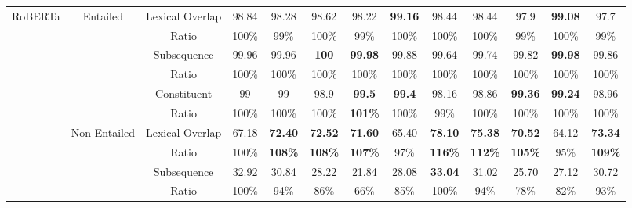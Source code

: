\begin{table}[]
\begin{tabular}{|c|c|c|c|c|c|c|c|c|c|c|c|c|}
\multirow{14}{*}{RoBERTa} & \multirow{6}{*}{Entailed}     & Lexical Overlap & 98.84                     & 98.28                          & 98.62   & 98.22   & \bf 99.16   & 98.44   & 98.44   & 97.9   & \bf 99.08  & 97.7   \\ \cline{3-13} 
                          &                               & Ratio           & 100\%                     & 99\%                           & 100\%   & 99\%    & 100\%   & 100\%   & 100\%   & 99\%   & 100\%  & 99\%   \\ \cline{3-13} 
                          &                               & Subsequence     & 99.96                     & 99.96                          & \bf 100     & \bf 99.98   & 99.88   & 99.64   & 99.74   & 99.82  & \bf 99.98  & 99.86  \\ \cline{3-13} 
                          &                               & Ratio           & 100\%                     & 100\%                          & 100\%   & 100\%   & 100\%   & 100\%   & 100\%   & 100\%  & 100\%  & 100\%  \\ \cline{3-13} 
                          &                               & Constituent     & 99                        & 99                             & 98.9    & \bf 99.5    & \bf 99.4    & 98.16   & 98.86   & \bf 99.36  & \bf 99.24  & 98.96  \\ \cline{3-13} 
                          &                               & Ratio           & 100\%                     & 100\%                          & 100\%   & \bf 101\%   & 100\%   & 99\%    & 100\%   & 100\%  & 100\%  & 100\%  \\ \cline{2-13} 
                          & \multirow{6}{*}{Non-Entailed} & Lexical Overlap & 67.18                     & \bf 72.40                          & \bf 72.52   & \bf 71.60   & 65.40   & \bf 78.10   & \bf 75.38   & \bf 70.52  & 64.12  & \bf 73.34  \\ \cline{3-13} 
                          &                               & Ratio           & 100\%                     & \bf 108\%                          & \bf 108\%   & \bf 107\%   & 97\%    & \bf 116\%   & \bf 112\%   & \bf 105\%  & 95\%   & \bf 109\%  \\ \cline{3-13} 
                          &                               & Subsequence     & 32.92                     & 30.84                          & 28.22   & 21.84   & 28.08   & \bf 33.04   & 31.02   & 25.70  & 27.12  & 30.72  \\ \cline{3-13} 
                          &                               & Ratio           & 100\%                     & 94\%                           & 86\%    & 66\%    & 85\%    & 100\%   & 94\%    & 78\%   & 82\%   & 93\%   \\ \cline{3-13} 

\end{tabular}
\end{table}
